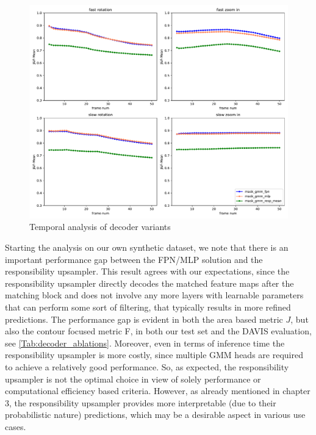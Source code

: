 \begin{figure}[ht!]
    \centering
    \includegraphics[width=1.\linewidth]{figures/04_experiments/decoder_ablations/mask_gmm_fpn-mask_gmm_mlp-mask_gmm_resp_mean-movement_all.pdf}
    \caption{Temporal analysis of decoder variants}
    \label{fig:decoder_abl_all}
    
\end{figure}






Starting the analysis on our own synthetic dataset, we note that there is an important performance gap between the FPN/MLP solution and the responsibility upsampler. This result agrees with our expectations, since the responsibility upsampler directly decodes the matched feature maps after the matching block and does not involve any more layers with learnable parameters that can perform some sort of filtering, that typically results in more refined predictions. The performance gap is evident in both the area based metric $J$, but also the contour focused metric F, in both our test set and the DAVIS evaluation, see \tabref\ref{Tab:decoder_ablations}. Moreover, even in terms of inference time the responsibility upsampler is more costly, since multiple GMM heads are required to achieve a relatively good performance. So, as expected, the responsibility upsampler is not the optimal choice in view of solely performance or computational efficiency based criteria. However, as already mentioned in chapter 3, the responsibility upsampler provides more interpretable (due to their probabilistic nature) predictions, which may be a desirable aspect in various use cases. \par

